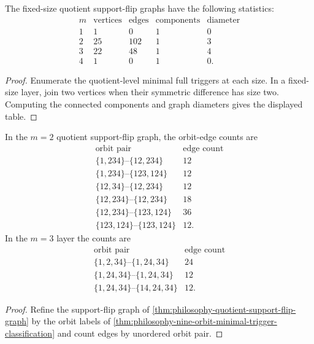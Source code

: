 \begin{theorem}
\label{thm:philosophy-quotient-support-flip-graph}
The fixed-size quotient support-flip graphs have the following
statistics:
$$
\begin{array}{c|r|r|r|r}
  m & \text{vertices} & \text{edges} & \text{components} & \text{diameter}\\
  \hline
  1 & 1 & 0 & 1 & 0\\
  2 & 25 & 102 & 1 & 3\\
  3 & 22 & 48 & 1 & 4\\
  4 & 1 & 0 & 1 & 0.
\end{array}
$$
\end{theorem}
\begin{proof}
Enumerate the quotient-level minimal full triggers at each size. In a
fixed-size layer, join two vertices when their symmetric difference has
size two. Computing the connected components and graph diameters gives
the displayed table.
\end{proof}

\begin{theorem}
\label{thm:philosophy-minimal-trigger-orbit-edge-structure}
In the $m=2$ quotient support-flip graph, the orbit-edge counts are
$$
\begin{array}{c|r}
  \text{orbit pair} & \text{edge count}\\
  \hline
  \{1,234\}\text{--}\{12,234\} & 12\\
  \{1,234\}\text{--}\{123,124\} & 12\\
  \{12,34\}\text{--}\{12,234\} & 12\\
  \{12,234\}\text{--}\{12,234\} & 18\\
  \{12,234\}\text{--}\{123,124\} & 36\\
  \{123,124\}\text{--}\{123,124\} & 12.
\end{array}
$$
In the $m=3$ layer the counts are
$$
\begin{array}{c|r}
  \text{orbit pair} & \text{edge count}\\
  \hline
  \{1,2,34\}\text{--}\{1,24,34\} & 24\\
  \{1,24,34\}\text{--}\{1,24,34\} & 12\\
  \{1,24,34\}\text{--}\{14,24,34\} & 12.
\end{array}
$$
\end{theorem}
\begin{proof}
Refine the support-flip graph of
\autoref{thm:philosophy-quotient-support-flip-graph} by the orbit labels
of \autoref{thm:philosophy-nine-orbit-minimal-trigger-classification}
and count edges by unordered orbit pair.
\end{proof}

